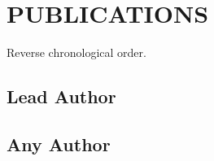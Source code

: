\section{\large PUBLICATIONS}
 Reverse chronological order.

\subsection{\large \sc Lead Author}
\vspace{1\baselineskip}
\begin{list2b}

\end{list2b}

\subsection{\large \sc Any Author}
\vspace{1\baselineskip}
\begin{list2b}

\end{list2b}

\iffalse
\subsection{\large \sc Submitted or In Preparation}
\vspace{1\baselineskip}
\begin{list2b}

\end{list2b}
\fi



% 

